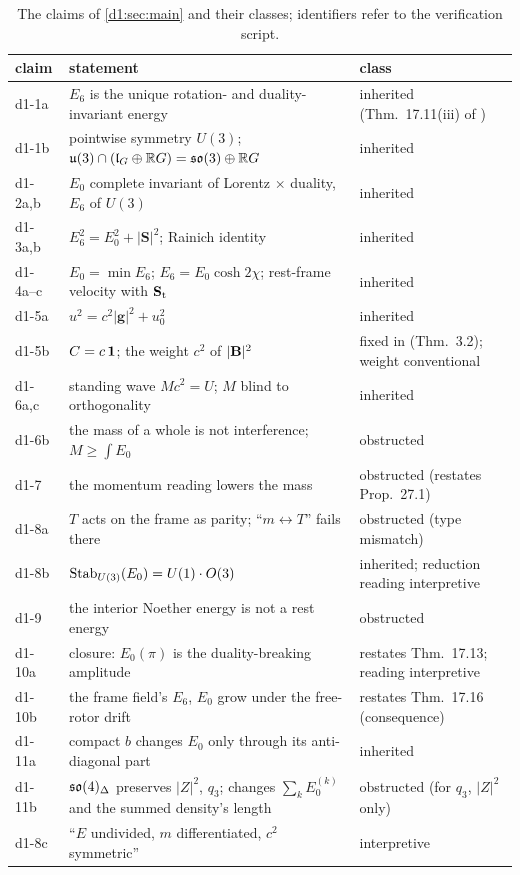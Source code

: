 \begin{table}[t]
\centering
\small
\begin{tabular}{@{}l>{\raggedright\arraybackslash}p{7.4cm}>{\raggedright\arraybackslash}p{5.6cm}@{}}
\toprule
claim & statement & class\\
\midrule
d1-1a & $E_6$ is the unique rotation- and duality-invariant energy & inherited (Thm.~17.11(iii) of \cite{ES17})\\
d1-1b & pointwise symmetry $U(3)$; $\mathfrak{u}(3)\cap(\mathfrak l_G\oplus\mathbb{R} G)=\mathfrak{so}(3)\oplus\mathbb{R} G$ & inherited\\
d1-2a,b & $E_0$ complete invariant of Lorentz $\times$ duality, $E_6$ of $U(3)$ & inherited\\
d1-3a,b & $E_6^2=E_0^2+|\mathbf S|^2$; Rainich identity & inherited\\
d1-4a--c & $E_0=\min E_6$; $E_6=E_0\cosh2\chi$; rest-frame velocity with $\mathbf S_{\rm t}$ & inherited\\
d1-5a & $u^2=c^2|\mathbf g|^2+u_0^2$ & inherited\\
d1-5b & $C=c\,\mathbf 1$; the weight $c^2$ of $|\mathbf B|^2$ & fixed in \cite{ES17} (Thm.~3.2); weight conventional\\
d1-6a,c & standing wave $Mc^2=U$; $M$ blind to orthogonality & inherited\\
d1-6b & the mass of a whole is not interference; $M\ge\int E_0$ & obstructed\\
d1-7 & the momentum reading lowers the mass & obstructed (restates Prop.~27.1)\\
d1-8a & $T$ acts on the frame as parity; ``$m\leftrightarrow T$'' fails there & obstructed (type mismatch)\\
d1-8b & $\operatorname{Stab}_{U(3)}(E_0)=U(1)\cdot O(3)$ & inherited; reduction reading interpretive\\
d1-9 & the interior Noether energy is not a rest energy & obstructed\\
d1-10a & closure: $E_0(\pi)$ is the duality-breaking amplitude & restates \cite{ES17} Thm.~17.13; reading interpretive\\
d1-10b & the frame field's $E_6$, $E_0$ grow under the free-rotor drift & restates \cite{ES17} Thm.~17.16 (consequence)\\
d1-11a & compact $b$ changes $E_0$ only through its anti-diagonal part & inherited\\
d1-11b & $\mathfrak{so}(4)_\Delta$ preserves $|Z|^2$, $q_3$; changes $\sum_kE_0^{(k)}$ and the summed density's length & obstructed (for $q_3$, $|Z|^2$ only)\\
d1-8c & ``$E$ undivided, $m$ differentiated, $c^2$ symmetric'' & interpretive\\
\bottomrule
\end{tabular}
\caption{The claims of \cref{d1:sec:main} and their classes; identifiers refer to the verification script.}
\label{d1:tab:claims}
\end{table}

